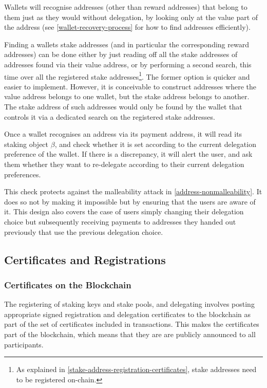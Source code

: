 \documentclass[11pt,a4paper]{article}
\begin{document}
Wallets will recognise addresses (other than reward addresses) that belong to
them just as they would without delegation, by looking only at the
value part of the address (see \cref{wallet-recovery-process} for how to find
addresses efficiently).

Finding a wallets stake addresses (and in particular the corresponding reward
addresses) can be done either by just reading off all the stake addresses of
addresses found via their value address, or by performing a second search, this
time over all the registered stake addresses\footnote{As explained in
  \cref{stake-address-registration-certificates}, stake addresses need to be
  registered on-chain.}. The former option is quicker and easier to implement.
However, it is conceivable to construct addresses where the value address
belongs to one wallet, but the stake address belongs to another. The stake
address of such addresses would only be found by the wallet that controls it via
a dedicated search on the registered stake addresses.

Once a wallet recognises an address via its payment address, it will read its
staking object \(\beta\), and check whether it is set according
to the current delegation preference of the wallet. If there is a
discrepancy, it will alert the user, and ask them whether they want to
re-delegate according to their current delegation preferences.

This check protects against the malleability attack in
\cref{address-nonmalleability}. It does so not by making it impossible but
by ensuring that the users are aware of it. This design also covers the case
of users simply changing their delegation choice but subsequently receiving
payments to addresses they handed out previously that use the previous
delegation choice.

\subsection{Certificates and Registrations}
\label{certificates-and-registrations}

\subsubsection{Certificates on the Blockchain}
\label{certificates-on-the-blockchain}

The registering of staking keys and stake pools, and delegating
involves posting appropriate signed registration and delegation certificates to
the blockchain as part of the set of certificates included in
transactions. This makes the certificates part of
the blockchain, which means that they are are publicly announced to all
participants.
\end{document}
